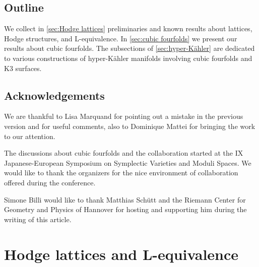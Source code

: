 \documentclass{amsart}
\begin{document}
\subsection*{Outline}

We collect in \autoref{sec:Hodge lattices} preliminaries and known results about lattices, Hodge structures, and L-equivalence. In \autoref{sec:cubic fourfolds} we present our results about cubic fourfolds. The subsections of \autoref{sec:hyper-Kähler} are dedicated to various constructions of hyper-Kähler manifolds involving cubic fourfolds and K3 surfaces. 

    \subsection*{Acknowledgements}
We are thankful to Lisa Marquand for pointing out a mistake in the previous version and for useful comments, also to Dominique Mattei for bringing the work \cite{maulik2025d} to our attention. 

The discussions about cubic fourfolds and the collaboration started at the IX Japanese-European Symposium on Symplectic Varieties and Moduli Spaces. We would like to thank the organizers for the nice environment of collaboration offered during the conference.

Simone Billi would like to thank Matthias Schütt and the Riemann Center for Geometry and Physics of Hannover for hosting and supporting him during the writing of this article.




\section{Hodge lattices and L-equivalence}\label{sec:Hodge lattices}
\end{document}
